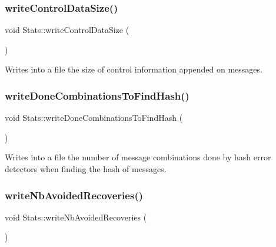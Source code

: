 \mbox{\label{class_stats_a49086baebc806841600c8545b5315149}} 
\subsubsection{\texorpdfstring{write\+Control\+Data\+Size()}{writeControlDataSize()}}
{\footnotesize\ttfamily void Stats\+::write\+Control\+Data\+Size (\begin{DoxyParamCaption}{ }\end{DoxyParamCaption})\hspace{0.3cm}{\ttfamily [private]}}



Writes into a file the size of control information appended on messages. 

\mbox{\label{class_stats_a73a83aa6b190ceb71e8ed2b131338d81}} 
\subsubsection{\texorpdfstring{write\+Done\+Combinations\+To\+Find\+Hash()}{writeDoneCombinationsToFindHash()}}
{\footnotesize\ttfamily void Stats\+::write\+Done\+Combinations\+To\+Find\+Hash (\begin{DoxyParamCaption}{ }\end{DoxyParamCaption})\hspace{0.3cm}{\ttfamily [private]}}



Writes into a file the number of message combinations done by hash error detectors when finding the hash of messages. 

\mbox{\label{class_stats_ac6a0fdf44cc2a3dc11ff22eb75faacf2}} 
\subsubsection{\texorpdfstring{write\+Nb\+Avoided\+Recoveries()}{writeNbAvoidedRecoveries()}}
{\footnotesize\ttfamily void Stats\+::write\+Nb\+Avoided\+Recoveries (\begin{DoxyParamCaption}{ }\end{DoxyParamCaption})\hspace{0.3cm}{\ttfamily [private]}}



